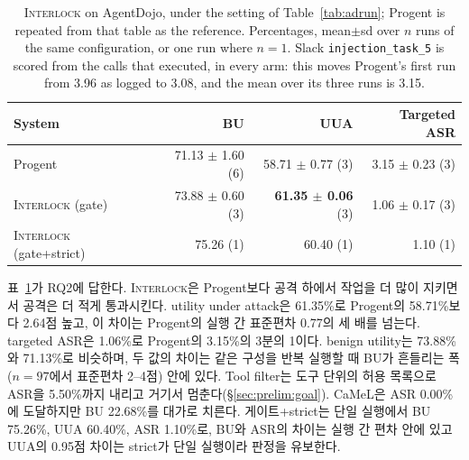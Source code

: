 \documentclass[acmsmall,screen,review,anonymous]{acmart}
\begin{document}
\begin{table}[t]
\caption{\textsc{Interlock} on AgentDojo, under the setting of Table~\ref{tab:adrun}; Progent is repeated from that table as the reference. Percentages, mean$\pm$sd over $n$ runs of the same configuration, or one run where $n=1$. Slack \texttt{injection\_task\_5} is scored from the calls that executed, in every arm: this moves Progent's first run from 3.96 as logged to 3.08, and the mean over its three runs is 3.15.}
\label{tab:guard}
\small
\begin{tabular}{lrrr}
\toprule
System & BU & UUA & Targeted ASR \\
\midrule
Progent~\cite{shi2025progent} & 71.13 $\pm$ 1.60 (6) & 58.71 $\pm$ 0.77 (3) & 3.15 $\pm$ 0.23 (3) \\
\midrule
\textsc{Interlock} (gate) & 73.88 $\pm$ 0.60 (3) & \textbf{61.35 $\pm$ 0.06} (3) & 1.06 $\pm$ 0.17 (3) \\
\textsc{Interlock} (gate+strict) & 75.26 (1) & 60.40 (1) & 1.10 (1) \\
\bottomrule
\end{tabular}
\end{table}

표~\ref{tab:guard}가 RQ2에 답한다. \textsc{Interlock}은 Progent보다 공격 하에서 작업을 더 많이 지키면서 공격은 더 적게 통과시킨다. utility under attack은 61.35\%로 Progent의 58.71\%보다 2.64점 높고, 이 차이는 Progent의 실행 간 표준편차 0.77의 세 배를 넘는다. targeted ASR은 1.06\%로 Progent의 3.15\%의 3분의 1이다. benign utility는 73.88\%와 71.13\%로 비슷하며, 두 값의 차이는 같은 구성을 반복 실행할 때 BU가 흔들리는 폭($n=97$에서 표준편차 2--4점) 안에 있다. Tool filter는 도구 단위의 허용 목록으로 ASR을 5.50\%까지 내리고 거기서 멈춘다(\S\ref{sec:prelim:goal}). CaMeL은 ASR 0.00\%에 도달하지만 BU 22.68\%를 대가로 치른다. 게이트+strict는 단일 실행에서 BU 75.26\%, UUA 60.40\%, ASR 1.10\%로, BU와 ASR의 차이는 실행 간 편차 안에 있고 UUA의 0.95점 차이는 strict가 단일 실행이라 판정을 유보한다.
\end{document}
